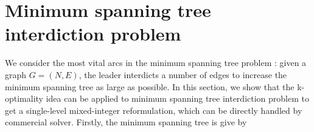 \documentclass[11pt]{article}
\newcommand{\EE}{\mathbb{E}}
\begin{document}
%
%
%
%

\section{Minimum spanning tree interdiction problem}
We consider the most vital arcs in the minimum spanning tree problem \cite{frederickson1999increasing,zenklusen20151}: given a graph $G = (N, E)$, the leader interdicts a number of edges to increase the minimum spanning tree as large as possible.  In this section, we show that the k-optimality idea can be applied to minimum spanning tree interdiction problem to get a single-level mixed-integer reformulation, which can be directly handled by commercial solver. Firstly, the minimum spanning tree is give by
\end{document}
